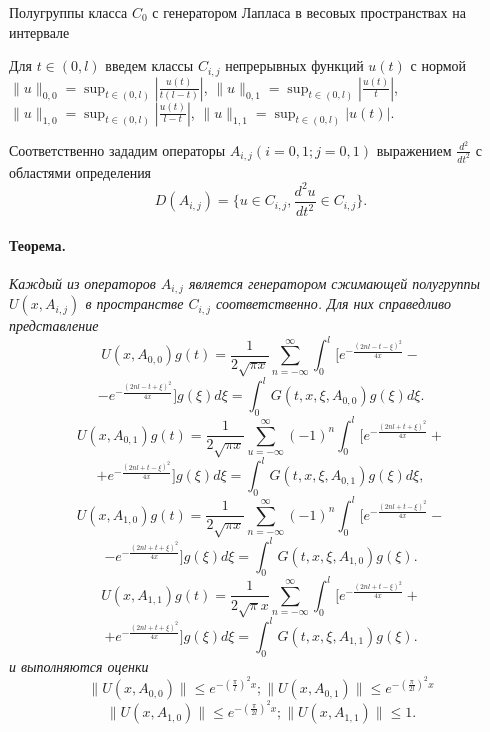 \vzmstitle
{
	Полугруппы класса $C_0$ с генератором Лапласа в весовых пространствах на интервале
}


\vzmscaption

Для $t\in(0,l)$ введем классы $C_{i,j}$ непрерывных функций $u(t)$ с нормой
$  \|u\|_{0,0}=\sup_{t\in(0,l)} |\frac{u(t)}{t(l-t)}|$, $\|u\|_{0,1}=\sup_{t\in(0,l)} |\frac{u(t)}{t}|$, $\|u\|_{1,0}=\sup_{t\in(0,l)} |\frac{u(t)}{l-t}|$, $\|u\|_{1,1}=\sup_{t\in(0,l)} |u(t)|$.

Соответственно зададим операторы $A_{i, j}(i = 0, 1; j = 0, 1)$
 выражением $\frac{d^2}{dt^2}$ с областями
определения $$D(A_{i, j}) = \{ u \in C_{i, j},
\frac{d^2u}{dt^2} \in C_{i, j} \}.$$
\paragraph{Теорема.} {\it
	Каждый из операторов $A_{i,j}$ является генератором сжимающей полугруппы
$U(x,A_{i,j})$ в пространстве $C_{i,j}$ соответственно. Для них справедливо представление
$$
U(x,A_{0,0})g(t)=\frac{1}{2\sqrt{\pi x}}\sum_{n=-\infty}^{\infty}\int_{0}^{l}[e^{-\frac{(2nl-t-\xi)^2}{4x}}-
$$
$$-e^{-\frac{(2nl-t+\xi)^2}{4x}}]g(\xi)d\xi=\int_{0}^{l}G(t,x,\xi,A_{0,0})g(\xi)d\xi.$$
$$U(x,A_{0,1})g(t)=\frac{1}{2\sqrt{\pi
x}}\sum_{u=-\infty}^{\infty}(-1)^{n}\int_{0}^{l}[e^{-\frac{(2nl+t+\xi)^2}{4x}}+$$ $$+e^{-\frac{(2nl+t-\xi)^2}{4x}}]g(\xi)d\xi=
\int_{0}^{l}G(t,x,\xi,A_{0,1})g(\xi)d\xi,$$
$$U(x,A_{1,0})g(t)=\frac{1}{2\sqrt{\pi x}}\sum_{n=-\infty}^{\infty}(-1)^n\int_{0}^{l}[e^{-\frac{(2nl+t-\xi)^2}{4x}}
-$$ $$- e^{-\frac{(2nl+t+\xi)^2}{4x}}]g(\xi)d\xi=\int_{0}^{l}G(t,x,\xi,A_{1,0})g(\xi).$$ $$
U(x,A_{1,1})g(t)=\frac{1}{2\sqrt{\pi}x}\sum_{n=-\infty}^{\infty}
\int_{0}^{l}[e^{-\frac{(2nl+t-\xi)^2}{4x}}+$$ $$+e^{-\frac{(2nl+t+\xi)^2}{4x}}]g(\xi)d\xi=\int_{0}^{l}G(t,x,\xi,A_{1,1})g(\xi).$$
 и выполняются оценки
 $$
\|U(x,A_{0,0})\|\leq e^{-(\frac{\pi}{l})^{2}x};\|U(x,A_{0,1})\|\leq e^{-(\frac{\pi}{2l})^{2}x}$$
$$\|U(x,A_{1,0})\|\leq e^{-(\frac{\pi}{2l})^{2}x};\|U(x,A_{1,1})\|\leq
1.$$}



